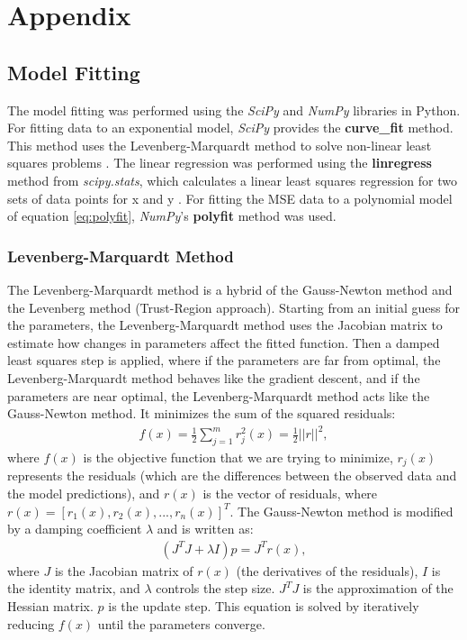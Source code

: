 \chapter{Appendix}\label{chap:appendix}
\section{Model Fitting}\label{sec:modelfitting}
The model fitting was performed using the \textit{SciPy} and \textit{NumPy} libraries in Python. For fitting data to an exponential model, \textit{SciPy} provides the \textbf{curve\_fit} method. This method uses the Levenberg-Marquardt method to solve non-linear least squares problems \cite{SciPyCurveFit}. The linear regression was performed using the \textbf{linregress} method from \textit{scipy.stats}, which calculates a linear least squares regression for two sets of data points for x and y \cite{SciPyLinRegress}. For fitting the MSE data to a polynomial model of equation \ref{eq:polyfit}, \textit{NumPy}'s \textbf{polyfit} method was used.

\subsection{Levenberg-Marquardt Method}\label{subsec:lmMethod}
The Levenberg-Marquardt method is a hybrid of the Gauss-Newton method and the Levenberg method (Trust-Region approach). Starting from an initial guess for the parameters, the Levenberg-Marquardt method uses the Jacobian matrix to estimate how changes in parameters affect the fitted function. Then a damped least squares step is applied, where if the parameters are far from optimal, the Levenberg-Marquardt method behaves like the gradient descent, and if the parameters are near optimal, the Levenberg-Marquardt method acts like the Gauss-Newton method. It minimizes the sum of the squared residuals:
\begin{align}
    f(x)=\frac{1}{2}\sum_{j=1}^{m}{r_{j}^{2}(x)=\frac{1}{2}||r||^{2}},
\end{align}
where $f(x)$ is the objective function that we are trying to minimize, $r_{j}(x)$ represents the residuals (which are the differences between the observed data and the model predictions), and $r(x)$ is the vector of residuals, where $r(x)=[r_{1}(x), r_{2}(x),...,r_{n}(x)]^T$. The Gauss-Newton method is modified by a damping coefficient $\lambda$ and is written as:
\begin{align}
    (J^{T}J+ \lambda I)p = J^{T}r(x),
\end{align}
where $J$ is the Jacobian matrix of $r(x)$ (the derivatives of the residuals), $I$ is the identity matrix, and $\lambda$ controls the step size. $J^{T}J$ is the approximation of the Hessian matrix. $p$ is the update step. This equation is solved by iteratively reducing $f(x)$ until the parameters converge.

